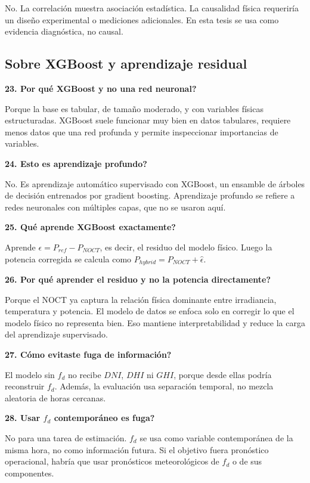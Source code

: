 \documentclass[11pt, letterpaper]{article}
\newcommand{\fd}{f_d}
\begin{document}
No. La correlaci\'on muestra asociaci\'on estad\'istica. La causalidad f\'isica requerir\'ia un dise\~no experimental o mediciones adicionales. En esta tesis se usa como evidencia diagn\'ostica, no causal.

\subsection{Sobre XGBoost y aprendizaje residual}

\textbf{23. \textquestiondown Por qu\'e XGBoost y no una red neuronal?}

Porque la base es tabular, de tama\~no moderado, y con variables f\'isicas estructuradas. XGBoost suele funcionar muy bien en datos tabulares, requiere menos datos que una red profunda y permite inspeccionar importancias de variables.

\textbf{24. \textquestiondown Esto es aprendizaje profundo?}

No. Es aprendizaje autom\'atico supervisado con XGBoost, un ensamble de \'arboles de decisi\'on entrenados por gradient boosting. Aprendizaje profundo se refiere a redes neuronales con m\'ultiples capas, que no se usaron aqu\'i.

\textbf{25. \textquestiondown Qu\'e aprende XGBoost exactamente?}

Aprende \(\epsilon=P_{ref}-P_{NOCT}\), es decir, el residuo del modelo f\'isico. Luego la potencia corregida se calcula como \(P_{hybrid}=P_{NOCT}+\widehat{\epsilon}\).

\textbf{26. \textquestiondown Por qu\'e aprender el residuo y no la potencia directamente?}

Porque el NOCT ya captura la relaci\'on f\'isica dominante entre irradiancia, temperatura y potencia. El modelo de datos se enfoca solo en corregir lo que el modelo f\'isico no representa bien. Eso mantiene interpretabilidad y reduce la carga del aprendizaje supervisado.

\textbf{27. \textquestiondown C\'omo evitaste fuga de informaci\'on?}

El modelo sin \(\fd\) no recibe \(DNI\), \(DHI\) ni \(GHI\), porque desde ellas podr\'ia reconstruir \(\fd\). Adem\'as, la evaluaci\'on usa separaci\'on temporal, no mezcla aleatoria de horas cercanas.

\textbf{28. \textquestiondown Usar \(\fd\) contempor\'aneo es fuga?}

No para una tarea de estimaci\'on. \(\fd\) se usa como variable contempor\'anea de la misma hora, no como informaci\'on futura. Si el objetivo fuera pron\'ostico operacional, habr\'ia que usar pron\'osticos meteorol\'ogicos de \(\fd\) o de sus componentes.
\end{document}
